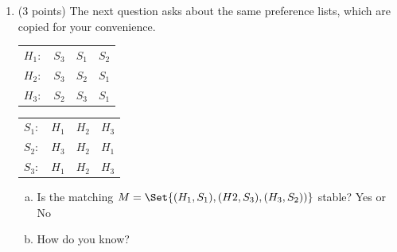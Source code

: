 \documentclass[11pt]{article}
\begin{document}
\begin{enumerate}
\begin{enumerate}[(a)]

\item Is the matching $M = \Set{(H_1, S3), (H_2, S_1), (H_3, S_2)}$ stable? Yes or No

\item How do you know?
\vspace{1in}
\end{enumerate}

\item (3 points) The next question asks about the same preference lists, which
are copied for your convenience.

\begin{center}
\begin{tabular}{ c c c c }
$H_1:$ & $S_3$ & $S_1$ & $S_2$ \\
$H_2:$ & $S_3$ & $S_2$ & $S_1$ \\
$H_3:$ & $S_2$ & $S_3$ & $S_1$
\end{tabular}
\qquad
\begin{tabular}{ c c c c }
$S_1:$ & $H_1$ & $H_2$ & $H_3$ \\
$S_2:$ & $H_3$ & $H_2$ & $H_1$ \\
$S_3:$ & $H_1$ & $H_2$ & $H_3$
\end{tabular}
\end{center}


\begin{enumerate}[(a)]

\item Is the matching $M = \Set{(H_1, S_1), (H2, S_3), (H_3, S_2))}$ stable?  Yes or No

\item How do you know?
\vspace{1in}
    
\end{enumerate}

\end{enumerate}
\end{document}
